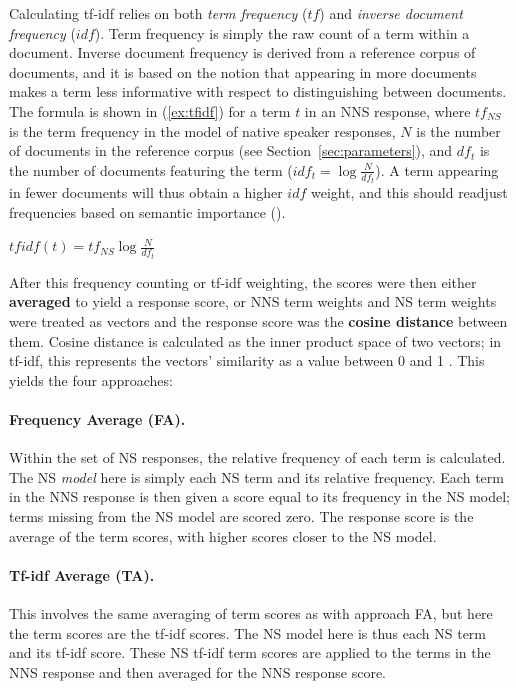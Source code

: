 Calculating tf-idf relies on both \emph{term frequency} ($tf$) and
\emph{inverse document frequency} ($idf$).  Term frequency is simply
the raw count of a term within a document. Inverse document frequency is derived from a reference corpus of documents, and it is based on the notion that appearing in more documents makes a term less informative with respect
to distinguishing between documents.  The formula is shown in
(\ref{ex:tfidf}) for a term $t$ in an NNS response, where $tf_{NS}$ is the term frequency in the model of native speaker responses,
$N$ is the number of documents
in the reference corpus (see Section~\ref{sec:parameters}), and $df_{t}$ is the number of documents
featuring the term ($idf_{t} = \log \frac{N}{df_{t}}$).  A term
appearing in fewer documents will thus obtain a higher $idf$ weight,
and this should readjust frequencies based on semantic importance
(\citealp[][pp. 107-10]{schutze2008introduction}).

\begin{exe}
\ex\label{ex:tfidf} $tfidf(t) = tf_{NS} \log \frac{N}{df_{t}}$
\end{exe}

After this frequency counting or tf-idf weighting, the scores were then either
\textbf{averaged} to yield a response score, or NNS term
weights and NS term weights were treated as vectors and the response
score was the \textbf{cosine distance} between them. Cosine distance is calculated as the inner product space of two vectors; in tf-idf, this represents the vectors' similarity as a value between 0 and 1 \cite{singhal2001modern}. This
yields the four approaches:


\paragraph{Frequency Average (FA).} 
Within the set of NS responses, the relative frequency of each term is calculated. The NS \textit{model} here is simply each NS term and its relative frequency. Each term in
the NNS response is then given a score equal to its frequency in the
NS model; terms missing from the NS model are scored zero. The response score is
the average of the term scores, with higher scores closer to the NS model.

\paragraph{Tf-idf Average (TA).} This involves the same
averaging of term scores as with approach FA, but here the term scores are the tf-idf scores. The NS model here is thus each NS term and its tf-idf score. These NS tf-idf term scores are applied to the terms in the NNS response and then averaged for the NNS response score. 


